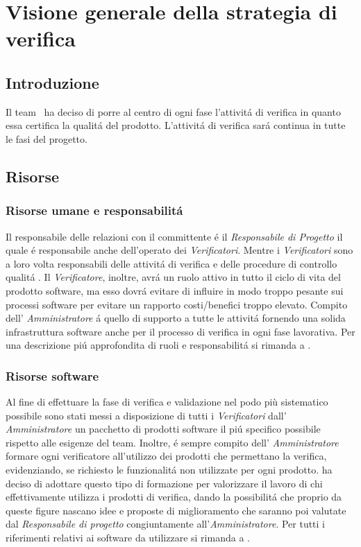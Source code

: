 \section{Visione generale della strategia di verifica}
\subsection{Introduzione}
Il team \gruppo ~ha deciso di porre al centro di ogni fase l'attivit\'a di verifica in quanto essa certifica la qualit\'a del prodotto. L'attivit\'a di verifica sar\'a continua in tutte le fasi del progetto.\\
\subsection{Risorse}
\subsubsection{Risorse umane e responsabilit\'a}
Il responsabile delle relazioni con il committente \'e il \textit{Responsabile di Progetto} il quale \'e responsabile anche dell'operato dei \textit{Verificatori}. Mentre i \textit{Verificatori} sono a loro volta responsabili delle attivit\'a di verifica e delle procedure di controllo qualit\'a . Il \textit{Verificatore}, inoltre, avr\'a un ruolo attivo in tutto il ciclo di vita del prodotto software, ma esso dovr\'a evitare di influire in modo troppo pesante sui processi software per evitare un rapporto costi/benefici troppo elevato. Compito dell' \textit{Amministratore} \'a quello di supporto a tutte le attivit\'a fornendo una solida infrastruttura software anche per il processo di verifica in ogni fase lavorativa.
Per una descrizione pi\'u approfondita di ruoli e responsabilit\'a si rimanda a \infoNDP.\\
\subsubsection{Risorse software}
Al fine di effettuare la fase di verifica e validazione nel podo più sistematico possibile sono stati messi a disposizione di tutti i \textit{Verificatori} dall' \textit{Amministratore} un pacchetto di prodotti software il pi\'u specifico possibile rispetto alle esigenze del team. Inoltre, \'e sempre compito dell' \textit{Amministratore} formare ogni verificatore all'utilizzo dei prodotti che permettano la verifica, evidenziando, se richiesto le funzionalit\'a non utilizzate per ogni prodotto. \gruppo{} ha deciso di adottare questo tipo di formazione per valorizzare il lavoro di chi effettivamente utilizza i prodotti di verifica, dando la possibilit\'a che proprio da queste figure nascano idee e proposte di miglioramento che saranno poi valutate dal \textit{Responsabile di progetto} congiuntamente all'\textit{Amministratore}.
Per tutti i riferimenti relativi ai software da utilizzare si rimanda a \infoNDP.
